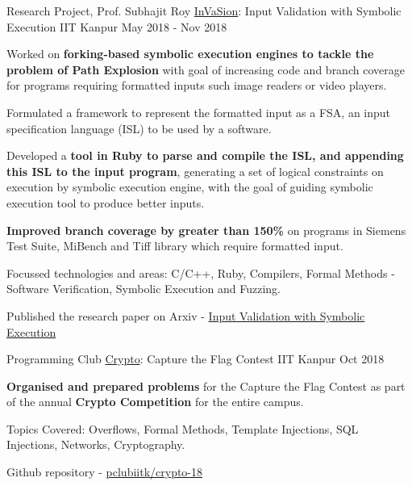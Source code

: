 \begin{cventries}


  \cventry
    {Research Project, Prof. Subhajit Roy} %
    {\href{https://arxiv.org/abs/2104.01438}{InVaSion}: Input Validation with Symbolic Execution} %
    {IIT Kanpur} %
    {May 2018 - Nov 2018} %
    {
      \begin{cvitems} %
      \item {Worked on \textbf{forking-based symbolic execution engines to tackle the problem of Path Explosion} with goal of increasing code and branch coverage for programs requiring formatted inputs such image readers or video players.}
      \item {Formulated a framework to represent the formatted input as a FSA, an input specification language (ISL) to be used by a software.}
        \item {Developed a \textbf{tool in Ruby to parse and compile the ISL, and appending this ISL to the input program}, generating a set of logical constraints on execution by symbolic execution engine, with the goal of guiding symbolic execution tool to produce better inputs.}
        \item {\textbf{Improved branch coverage by greater than 150\%} on programs in Siemens Test Suite, MiBench and Tiff library which require formatted input.}
        \item {Focussed technologies and areas: C/C++, Ruby, Compilers, Formal Methods - Software Verification, Symbolic Execution and Fuzzing.}
        \item {Published the research paper on Arxiv - \href{https://arxiv.org/abs/2104.01438}{Input Validation with Symbolic Execution}}
      \end{cvitems}
    }%



  \cventry
    {Programming Club} %
    {\href{https://github.com/pclubiitk/crypto-18}{Crypto}: Capture the Flag Contest} %
    {IIT Kanpur} %
    {Oct 2018} %
    {
      \begin{cvitems} %
      \item {\textbf{Organised and prepared problems} for the Capture the Flag Contest as part of the annual \textbf{Crypto Competition} for the entire campus.}
      \item {Topics Covered: Overflows, Formal Methods, Template Injections, SQL Injections, Networks, Cryptography.}
      \item {Github repository - \href{https://github.com/pclubiitk/crypto-18}{pclubiitk/crypto-18}}
      \end{cvitems}
    }


\end{cventries}
